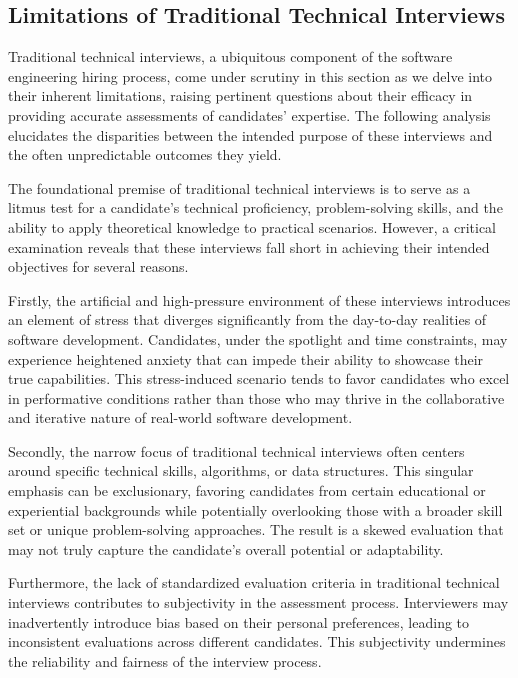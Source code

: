 \documentclass[
    a4paper, %
    10pt, %
    unnumberedsections, %
    twoside, %
]{LTJournalArticle}
\begin{document}
\subsection{Limitations of Traditional Technical Interviews}

Traditional technical interviews, a ubiquitous component of the software engineering hiring process, come under scrutiny in this section as we delve into their inherent limitations, raising pertinent questions about their efficacy in providing accurate assessments of candidates' expertise. The following analysis elucidates the disparities between the intended purpose of these interviews and the often unpredictable outcomes they yield.

The foundational premise of traditional technical interviews is to serve as a litmus test for a candidate's technical proficiency, problem-solving skills, and the ability to apply theoretical knowledge to practical scenarios. However, a critical examination reveals that these interviews fall short in achieving their intended objectives for several reasons.

Firstly, the artificial and high-pressure environment of these interviews introduces an element of stress that diverges significantly from the day-to-day realities of software development. Candidates, under the spotlight and time constraints, may experience heightened anxiety that can impede their ability to showcase their true capabilities. This stress-induced scenario tends to favor candidates who excel in performative conditions rather than those who may thrive in the collaborative and iterative nature of real-world software development.

Secondly, the narrow focus of traditional technical interviews often centers around specific technical skills, algorithms, or data structures. This singular emphasis can be exclusionary, favoring candidates from certain educational or experiential backgrounds while potentially overlooking those with a broader skill set or unique problem-solving approaches. The result is a skewed evaluation that may not truly capture the candidate's overall potential or adaptability.

Furthermore, the lack of standardized evaluation criteria in traditional technical interviews contributes to subjectivity in the assessment process. Interviewers may inadvertently introduce bias based on their personal preferences, leading to inconsistent evaluations across different candidates. This subjectivity undermines the reliability and fairness of the interview process.
\end{document}
